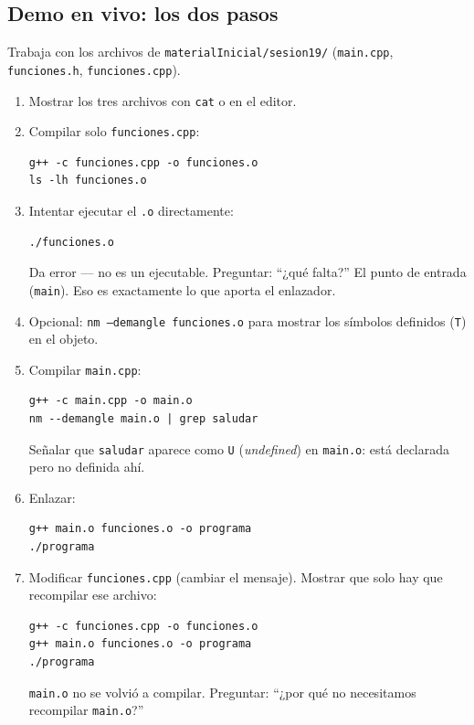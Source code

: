 \documentclass[12pt, oneside]{article}
\begin{document}
\subsection{Demo en vivo: los dos pasos}

\begin{notaprofesor}
  Trabaja con los archivos de \texttt{materialInicial/sesion19/}
  (\texttt{main.cpp}, \texttt{funciones.h}, \texttt{funciones.cpp}).

  \begin{enumerate}
    \item Mostrar los tres archivos con \texttt{cat} o en el editor.
    \item Compilar solo \texttt{funciones.cpp}:
\begin{verbatim}
g++ -c funciones.cpp -o funciones.o
ls -lh funciones.o
\end{verbatim}
    \item Intentar ejecutar el \texttt{.o} directamente:
\begin{verbatim}
./funciones.o
\end{verbatim}
          Da error — no es un ejecutable.  Preguntar: ``¿qué falta?''
          El punto de entrada (\texttt{main}).  Eso es exactamente lo
          que aporta el enlazador.
    \item Opcional: \texttt{nm --demangle funciones.o} para mostrar los
          símbolos definidos (\texttt{T}) en el objeto.
    \item Compilar \texttt{main.cpp}:
\begin{verbatim}
g++ -c main.cpp -o main.o
nm --demangle main.o | grep saludar
\end{verbatim}
          Señalar que \texttt{saludar} aparece como \texttt{U}
          (\textit{undefined}) en \texttt{main.o}: está declarada pero
          no definida ahí.
    \item Enlazar:
\begin{verbatim}
g++ main.o funciones.o -o programa
./programa
\end{verbatim}
    \item Modificar \texttt{funciones.cpp} (cambiar el mensaje).
          Mostrar que solo hay que recompilar ese archivo:
\begin{verbatim}
g++ -c funciones.cpp -o funciones.o
g++ main.o funciones.o -o programa
./programa
\end{verbatim}
          \texttt{main.o} no se volvió a compilar.  Preguntar:
          ``¿por qué no necesitamos recompilar \texttt{main.o}?''
  \end{enumerate}
\end{notaprofesor}
\end{document}
